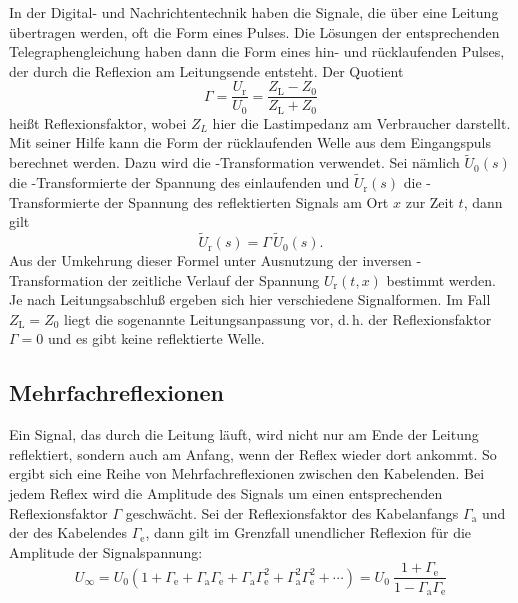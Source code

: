 In der Digital- und Nachrichtentechnik haben die Signale, die
über eine Leitung übertragen werden, oft die Form eines Pulses.
Die Lösungen der entsprechenden Telegraphengleichung haben dann
die Form eines hin- und rücklaufenden Pulses, der durch die
Reflexion am Leitungsende entsteht.  Der Quotient
%
\begin{equation}
\Gamma = \frac{U_\text{r}}{U_0} = \frac{Z_\text{L} - Z_0}{Z_\text{L} + Z_0}
\end{equation}
%
heißt Reflexionsfaktor, wobei $Z_L$ hier die Lastimpedanz am
Verbraucher darstellt.  Mit seiner Hilfe kann die Form der
rücklaufenden Welle aus dem Eingangspuls berechnet werden.  Dazu
wird die -Transformation verwendet.  Sei nämlich
$\tilde{U}_0(s)$ die -Transformierte der Spannung
des einlaufenden und $\tilde{U}_\text{r}(s)$ die
-Transformierte der Spannung des reflektierten
Signals am Ort $x$ zur Zeit $t$, dann gilt
%
\begin{equation}
\label{eq:reflex}
\tilde{U}_\text{r}(s) = \Gamma\, \tilde{U}_0(s).
\end{equation}
%
Aus der Umkehrung dieser Formel unter Ausnutzung der
inversen -Transformation der zeitliche Verlauf der
Spannung $U_\text{r}(t, x)$ bestimmt werden.  Je nach
Leitungsabschluß ergeben sich hier verschiedene Signalformen.  Im
Fall $Z_\text{L} = Z_0$ liegt die sogenannte Leitungsanpassung vor,
d.\,h. der Reflexionsfaktor $\Gamma = 0$ und es gibt keine
reflektierte Welle.

\subsection{Mehrfachreflexionen}

Ein Signal, das durch die Leitung läuft, wird nicht nur am Ende
der Leitung reflektiert, sondern auch am Anfang, wenn der Reflex
wieder dort ankommt.  So ergibt sich eine Reihe von
Mehrfachreflexionen zwischen den Kabelenden.  Bei jedem Reflex
wird die Amplitude des Signals um einen entsprechenden
Reflexionsfaktor $\Gamma$ geschwächt.  Sei der Reflexionsfaktor
des Kabelanfangs $\Gamma_\text{a}$ und der des Kabelendes
$\Gamma_\text{e}$, dann gilt im Grenzfall unendlicher Reflexion
für die Amplitude der Signalspannung:
%
\begin{equation}
  U_\infty = U_0(1 + \Gamma_\text{e} + \Gamma_\text{a} \Gamma_\text{e}
  + \Gamma_\text{a} \Gamma_\text{e}^2 + \Gamma_\text{a}^2
  \Gamma_\text{e}^2 + \dotsb) = U_0 \:\frac{1 + \Gamma_\text{e}}{1
    - \Gamma_\text{a} \Gamma_\text{e}}
\end{equation}
%

